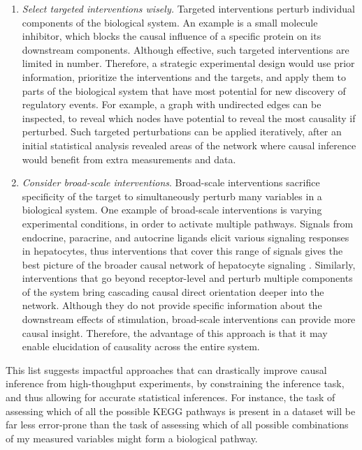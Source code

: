 \documentclass[journal=jacsat,manuscript=article]{achemso}
\begin{document}
\begin{enumerate}
\item \textit{Select targeted interventions wisely.} Targeted interventions perturb individual components of the biological system.  An example is a small molecule inhibitor, which blocks the causal influence of a specific protein on its downstream components. Although effective, such targeted interventions are limited in number. Therefore, a strategic experimental design would use prior information, prioritize the interventions and the targets, and apply them to parts of the biological system that have most potential for new discovery of regulatory events.  For example, a graph with undirected edges can be inspected, to reveal which nodes have potential to reveal the most causality if perturbed. Such targeted perturbations can be applied iteratively, after an initial statistical analysis revealed areas of the network where causal inference would benefit from extra measurements and data. 


\item \textit{Consider broad-scale interventions}. Broad-scale interventions sacrifice specificity of the target to simultaneously perturb many variables in a biological system. One example of broad-scale interventions is varying experimental conditions, in order to activate multiple pathways.  Signals from endocrine, paracrine, and autocrine ligands elicit various signaling responses in hepatocytes, thus interventions that cover this range of signals gives the best picture of the broader causal network of hepatocyte signaling \cite{alexopoulos2010networks}. Similarly, interventions that go beyond receptor-level and perturb multiple components of the system bring cascading causal direct orientation deeper into the network.  Although they do not provide specific information about the downstream effects of stimulation,  broad-scale interventions can provide more causal insight. Therefore, the advantage of this approach is that it may enable elucidation of  causality across the entire system.

\end{enumerate}

This list suggests impactful approaches that can drastically improve causal inference from high-thoughput experiments, by constraining the inference task, and thus allowing for accurate
statistical inferences. For instance, the task of assessing which of all
the possible KEGG pathways is present in a dataset will be far less
error-prone than the task of assessing which of all possible
combinations of my measured variables might form a biological pathway.
\end{document}
